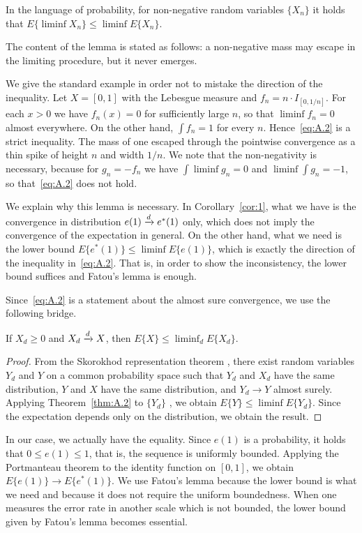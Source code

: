 In the language of probability, for non-negative random variables $\{X_n\}$ it
holds that $E\{\liminf X_n\}\le\liminf E\{X_n\}$.

The content of the lemma is stated as follows: a non-negative mass may escape in
the limiting procedure, but it never emerges.

We give the standard example in order not to mistake the direction of the
inequality. Let $X=[0,1]$ with the Lebesgue measure and $f_n=n\cdot I_{[0,1/n]}$.
For each $x>0$ we have $f_n(x)=0$ for sufficiently large $n$, so that
$\liminf f_n=0$ almost everywhere. On the other hand, $\int f_n=1$ for every $n$.
Hence~\eqref{eq:A.2} is a strict inequality. The mass of one escaped through the
pointwise convergence as a thin spike of height $n$ and width $1/n$. We note that
the non-negativity is necessary, because for $g_n=-f_n$ we have
$\int\liminf g_n=0$ and $\liminf\int g_n=-1$, so that~\eqref{eq:A.2} does not hold.

We explain why this lemma is necessary. In Corollary~\ref{cor:1}, what we have is
the convergence in distribution $e(1)\xrightarrow{d} e^*(1)$ only, which does not imply the
convergence of the expectation in general. On the other hand, what we need is the
lower bound $E\{e^*(1)\}\le\liminf E\{e(1)\}$, which is exactly the direction of
the inequality in~\eqref{eq:A.2}. That is, in order to show the inconsistency, the
lower bound suffices and Fatou's lemma is enough.

Since~\eqref{eq:A.2} is a statement about the almost sure convergence, we use the
following bridge.

\begin{lemma}
\label{lem:7}
If $X_d\ge 0$ and $X_d\xrightarrow{d} X$, then $E\{X\}\le\liminf_d E\{X_d\}$.
\end{lemma}

\begin{proof}
From the Skorokhod representation theorem \citep{billingsley1999}, there exist
random variables $Y_d$ and $Y$ on a common probability space such that $Y_d$ and
$X_d$ have the same distribution, $Y$ and $X$ have the same distribution, and
$Y_d\to Y$ almost surely. Applying Theorem~\ref{thm:A.2} to $\{Y_d\}$
\citep{durrett2019}, we obtain $E\{Y\}\le\liminf E\{Y_d\}$. Since the
expectation depends only on the distribution, we obtain the result.
\end{proof}

\begin{remark}
\label{rem:A.1}
In our case, we actually have the equality. Since $e(1)$ is a probability, it
holds that $0\le e(1)\le 1$, that is, the sequence is uniformly bounded. Applying
the Portmanteau theorem to the identity function on $[0,1]$, we obtain
$E\{e(1)\}\to E\{e^*(1)\}$. We use Fatou's lemma because the lower bound is what
we need and because it does not require the uniform boundedness. When one measures
the error rate in another scale which is not bounded, the lower bound given by
Fatou's lemma becomes essential.
\end{remark}
